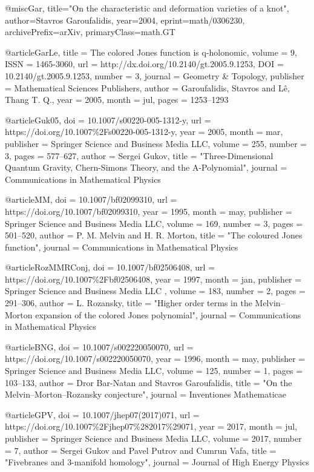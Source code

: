 @misc{Gar,
  title="{On the characteristic and deformation varieties of a knot}", 
  author={Stavros Garoufalidis},
  year={2004},
  eprint={math/0306230},
  archivePrefix={arXiv},
  primaryClass={math.GT}
}


@article{GarLe,
  title = {The colored {Jones} function is q-holonomic},
  volume = {9},
  ISSN = {1465-3060},
  url = {http://dx.doi.org/10.2140/gt.2005.9.1253},
  DOI = {10.2140/gt.2005.9.1253},
  number = {3},
  journal = {Geometry \& Topology},
  publisher = {Mathematical Sciences Publishers},
  author = {Garoufalidis,  Stavros and L\^e,  Thang T. Q.},
  year = {2005},
  month = jul,
  pages = {1253--1293}
}

@article{Guk05,
	doi = {10.1007/s00220-005-1312-y},
	url = {https://doi.org/10.1007\%2Fs00220-005-1312-y},
	year = 2005,
	month = {mar},
	publisher = {Springer Science and Business Media {LLC}},
	volume = {255},
	number = {3},
	pages = {577--627},
	author = {Sergei Gukov},
	title = "{Three-Dimensional Quantum Gravity, Chern-Simons Theory, and the A-Polynomial}",
	journal = {Communications in Mathematical Physics}
}

@article{MM,
  doi = {10.1007/bf02099310},
  url = {https://doi.org/10.1007/bf02099310},
  year = {1995},
  month = may,
  publisher = {Springer Science and Business Media {LLC}},
  volume = {169},
  number = {3},
  pages = {501--520},
  author = {P. M. Melvin and H. R. Morton},
  title = "{The coloured Jones function}",
  journal = {Communications in Mathematical Physics}
}

@article{RozMMRConj,
	doi = {10.1007/bf02506408},
	url = {https://doi.org/10.1007\%2Fbf02506408},
	year = 1997,
	month = {jan},
	publisher = {Springer Science and Business Media {LLC}
},
	volume = {183},
	number = {2},
	pages = {291--306},
	author = {L. Rozansky},
	title = "{Higher order terms in the {Melvin--Morton} expansion of the colored {Jones} polynomial}",
	journal = {Communications in Mathematical Physics}
}

@article{BNG,
  doi = {10.1007/s002220050070},
  url = {https://doi.org/10.1007/s002220050070},
  year = {1996},
  month = may,
  publisher = {Springer Science and Business Media {LLC}},
  volume = {125},
  number = {1},
  pages = {103--133},
  author = {Dror Bar-Natan and Stavros Garoufalidis},
  title = "{On the Melvin--Morton--Rozansky conjecture}",
  journal = {Inventiones Mathematicae}
}

@article{GPV,
	doi = {10.1007/jhep07(2017)071},
	url = {https://doi.org/10.1007\%2Fjhep07\%282017\%29071},
	year = 2017,
	month = {jul},
	publisher = {Springer Science and Business Media {LLC}},
	volume = {2017},
	number = {7},
	author = {Sergei Gukov and Pavel Putrov and Cumrun Vafa},
	title = "{Fivebranes and 3-manifold homology}",
	journal = {Journal of High Energy Physics}
}

